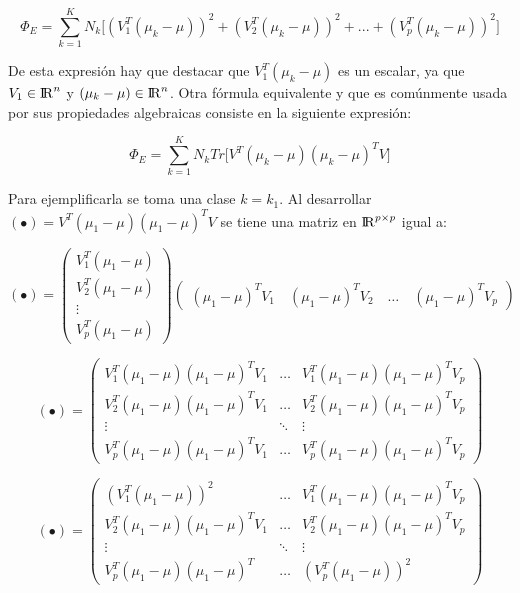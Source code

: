 \begin{equation}\label{eq:2.17}
  \Phi_E = \sum\limits_{k = 1}^{K} N_{k} \big[ (V_1^T (\mu_k - \mu))^2 + (V_2^T (\mu_k - \mu))^2+ ... + (V_p^T (\mu_k - \mu))^2 \big]
\end{equation}

De esta expresión hay que destacar que $V_1^T (\mu_k - \mu)$ es un escalar, ya que $V_1 \in {\rm I\!R}^n$ y $(\mu_k - \mu) \in {\rm I\!R}^{n}$. Otra fórmula equivalente y que es comúnmente usada por sus propiedades algebraicas consiste en la siguiente expresión:

\begin{equation}\label{eq:2.18}
\Phi_E = \sum\limits_{k = 1}^{K} N_{k} Tr \big[ V^T (\mu_k - \mu) (\mu_k - \mu)^T V \big]	
\end{equation}

Para ejemplificarla se toma una clase $k = k_1$.  Al desarrollar $(\bullet) = V^T (\mu_1 - \mu) (\mu_1 - \mu)^T V$ se tiene una matriz en ${\rm I\!R}^{p \times p}$ igual a:


\begin{equation*}
(\bullet)= \left(\!
    \begin{array}{c}
      V_1^T (\mu_1-\mu)\\
      V_2^T (\mu_1-\mu)\\
      \vdots \\
      V_p^T (\mu_1-\mu)
    \end{array}
  \!\right) 
  \left(\!\begin{array}{c}
      (\mu_1-\mu)^T V_1 \quad
      (\mu_1-\mu)^T V_2 \quad
      \hdots \quad
      (\mu_1-\mu)^T V_p
    \end{array}
  \!\right) 
\end{equation*} 

\begin{equation*}
(\bullet)= \left(\!
    \begin{array}{ccc}
      V_1^T (\mu_1-\mu) (\mu_1-\mu)^T V_1 & \hdots & V_1^T (\mu_1-\mu) (\mu_1-\mu)^T V_p  \\
      V_2^T (\mu_1-\mu) (\mu_1-\mu)^T V_1 & \hdots & V_2^T (\mu_1-\mu) (\mu_1-\mu)^T V_p  \\
      \vdots & \ddots & \vdots\\
      V_p^T (\mu_1-\mu) (\mu_1-\mu)^T V_1 & \hdots & V_p^T (\mu_1-\mu) (\mu_1-\mu)^T V_p
    \end{array}
  \!\right) 
\end{equation*} 


\begin{equation*}
(\bullet)= \left(\!
    \begin{array}{ccc}
      (V_1^T (\mu_1-\mu))^2 & \hdots & V_1^T (\mu_1-\mu) (\mu_1-\mu)^T V_p \\
       V_2^T (\mu_1-\mu) (\mu_1-\mu)^T V_1  & \hdots & V_2^T (\mu_1-\mu) (\mu_1-\mu)^T V_p  \\
      \vdots & \ddots & \vdots\\
      V_p^T (\mu_1-\mu) (\mu_1-\mu)^T  & \hdots & (V_p^T (\mu_1-\mu))^2
    \end{array}
  \!\right) 
\end{equation*} 

